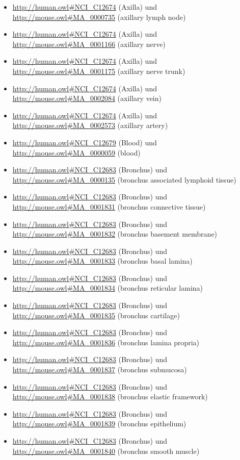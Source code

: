 \begin{itemize}
	\item \url{http://human.owl#NCI_C12674} (Axilla) und \url{http://mouse.owl#MA_0000735} (axillary lymph node)
	\item \url{http://human.owl#NCI_C12674} (Axilla) und \url{http://mouse.owl#MA_0001166} (axillary nerve)
	\item \url{http://human.owl#NCI_C12674} (Axilla) und \url{http://mouse.owl#MA_0001175} (axillary nerve trunk)
	\item \url{http://human.owl#NCI_C12674} (Axilla) und \url{http://mouse.owl#MA_0002084} (axillary vein)
	\item \url{http://human.owl#NCI_C12674} (Axilla) und \url{http://mouse.owl#MA_0002573} (axillary artery)
	\item \url{http://human.owl#NCI_C12679} (Blood\textunderscoreVessel) und \url{http://mouse.owl#MA_0000059} (blood)
	\item \url{http://human.owl#NCI_C12683} (Bronchus) und \url{http://mouse.owl#MA_0000135} (bronchus associated lymphoid tissue)
	\item \url{http://human.owl#NCI_C12683} (Bronchus) und \url{http://mouse.owl#MA_0001831} (bronchus connective tissue)
	\item \url{http://human.owl#NCI_C12683} (Bronchus) und \url{http://mouse.owl#MA_0001832} (bronchus basement membrane)
	\item \url{http://human.owl#NCI_C12683} (Bronchus) und \url{http://mouse.owl#MA_0001833} (bronchus basal lamina)
	\item \url{http://human.owl#NCI_C12683} (Bronchus) und \url{http://mouse.owl#MA_0001834} (bronchus reticular lamina)
	\item \url{http://human.owl#NCI_C12683} (Bronchus) und \url{http://mouse.owl#MA_0001835} (bronchus cartilage)
	\item \url{http://human.owl#NCI_C12683} (Bronchus) und \url{http://mouse.owl#MA_0001836} (bronchus lamina propria)
	\item \url{http://human.owl#NCI_C12683} (Bronchus) und \url{http://mouse.owl#MA_0001837} (bronchus submucosa)
	\item \url{http://human.owl#NCI_C12683} (Bronchus) und \url{http://mouse.owl#MA_0001838} (bronchus elastic framework)
	\item \url{http://human.owl#NCI_C12683} (Bronchus) und \url{http://mouse.owl#MA_0001839} (bronchus epithelium)
	\item \url{http://human.owl#NCI_C12683} (Bronchus) und \url{http://mouse.owl#MA_0001840} (bronchus smooth muscle)

\end{itemize}
